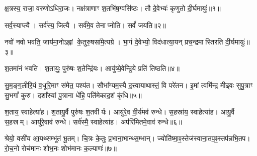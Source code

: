 
क्ष॒त्रस्य॒ राजा॒ वरु॑णोऽधिरा॒जः। नक्ष॑त्राणाꣳ श॒तभि॑ष॒ग्वसि॑ष्ठः। तौ दे॒वेभ्यः॑ कृणुतो दी॒र्घमायुः॑॥१॥

सर्व॒स्याप्त्यै। सर्व॑स्य॒ जित्यै। सर्व॑मे॒व तेनाप्नोति। सर्वं॑ जयति॥२॥

नवो॑ नवो भवति॒ जाय॑मा॒नोऽह्नां के॒तुरु॒षसा॑मे॒त्यग्रे।
भा॒गं दे॒वेभ्यो॒ विद॑धात्या॒यन् प्रच॒न्द्रमास्तिरति दी॒र्घमायुः॑॥३॥

श॒तमा॑नं भवति। श॒तायुः॒ पुरु॑षः श॒तेन्द्रि॑यः। आयु॑ष्ये॒वेन्द्रि॒ये प्रति॑ तिष्ठति॥४॥

सु॒म॒ङ्ग॒लीरि॒यं व॒धूरि॒माꣳ स॑मेत॒ पश्य॑त। 
सौभा᳚ग्यम॒स्यै द॒त्त्वायाथास्तं॒ वि परे॑तन। 
इ॒मां त्वमि॑न्द्र मीढ्वः सुपु॒त्राꣳ सु॒भगां᳚ कुरु। 
दशा᳚स्यां पु॒त्राना धे॑हि॒ पति॑मेकाद॒शं कृ॑धि॥५॥ 


श॒ताय॒ स्वाहेत्या॑ह। श॒तायु॒र्वै पुरु॑षः श॒तवीर्यः। आयु॑रे॒व वी॒र्य॑मव॑ रुन्धे। स॒हस्रा॑य॒ स्वाहेत्या॑ह। आयु॒र्वै स॒हस्रम्। आयु॑रे॒वाव॑ रुन्धे। सर्व॑स्मै॒ स्वाहेत्या॑ह। अप॑रिमितमे॒वाव॑ रुन्धे॥६॥


श्रेयो॒ वसी॑य आ॒यथ्सम्भू॑तं भू॒तम्। 
चि॒त्रः के॒तुः प्र॒भाना॒भान्थ्स॒म्भान्। 
ज्योति॑ष्मा॒ꣴ॒स्तेज॑स्वाना॒तप॒ꣴ॒स्तप॑न्नभि॒\-तप\sn{}। 
रो॒च॒नो रोच॑मानः शोभ॒नः शोभ॑मानः क॒ल्याणः॑॥७॥

